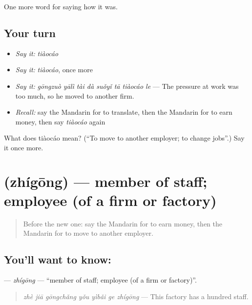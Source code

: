 \begin{grammarlens}[title={What you've built}]
One more word for saying how it was.
\end{grammarlens}

\subsection*{Your turn}
\begin{itemize}
\raggedright
  \item \emph{Say it:} \emph{tiàocáo}
  \item \emph{Say it:} \emph{tiàocáo}, once more
  \item \emph{Say it:} \emph{gōngzuò yālì tài dà suǒyǐ tā tiàocáo le} — The pressure at work was too much, so he moved to another firm.
  \item \emph{Recall:} say the Mandarin for to translate, then the Mandarin for to earn money, then say \emph{tiàocáo} again
\end{itemize}

\begin{tcolorbox}[breakable,colback=teal!4,colframe=teal!35!black,title={Before you move on}]
What does tiàocáo mean? (\textquotedblleft{}To move to another employer; to change jobs\textquotedblright{}.) Say it once more.
\end{tcolorbox}
\section[\texorpdfstring{\zh{职工} (zhígōng)}{职工 (zhígōng)}]{ (zhígōng) — member of staff; employee (of a firm or factory)}

\label{lesson:ZH-C489-zhigong}



\begin{quote}
Before the new one: say the Mandarin for to earn money, then the Mandarin for to move to another employer.
\end{quote}

\subsection*{You'll want to know: }
\textbf{} — \emph{zhígōng} — \textquotedblleft{}member of staff; employee (of a firm or factory)\textquotedblright{}.

\begin{quote}
\emph{zhè jiā gōngchǎng yǒu yìbǎi ge zhígōng} — This factory has a hundred staff.
\end{quote}

